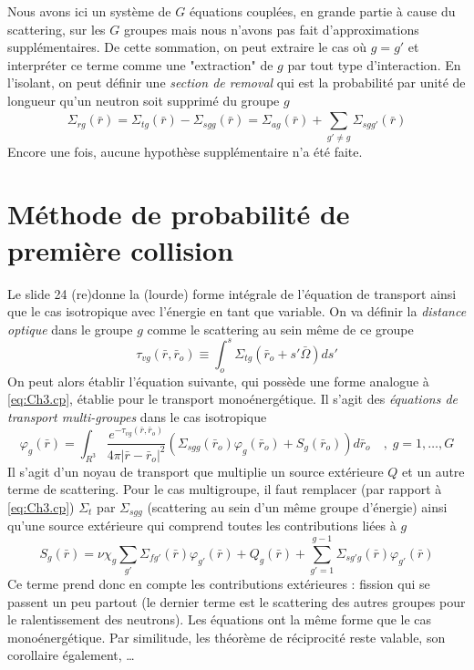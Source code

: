 Nous avons ici un système de $G$ équations couplées, en grande partie à cause du scattering, sur les
$G$ groupes mais nous n'avons pas fait d'approximations supplémentaires. De cette sommation, on 
peut extraire le cas où $g=g'$ et interpréter ce terme comme une "extraction" de $g$ par tout type 
d'interaction. En l'isolant, on peut définir une \textit{section de removal} qui est la probabilité par unité de longueur qu'un neutron soit supprimé du groupe $g$
\begin{equation}
{\Sigma _{rg}}(\bar r) = {\Sigma _{tg}}(\bar r) - {\Sigma _{sgg}}(\bar r) = {\Sigma _{ag}}(\bar r) + \sum\limits_{g' \ne g}^{}    {\Sigma _{sgg'}}(\bar r)
\end{equation}
Encore une fois, aucune hypothèse supplémentaire n'a été faite.







\newpage
\section{Méthode de probabilité de première collision}
Le slide 24 (re)donne la (lourde) forme intégrale de l'équation de transport ainsi que le cas 
isotropique avec l'énergie en tant que variable. On va définir la \textit{distance optique} dans le
groupe $g$ comme le scattering au sein même de ce groupe
\begin{equation}
{\tau _{vg}}(\bar r,{\bar r_o}) \equiv \int_o^s    {\Sigma _{tg}}({\bar r_o} + s'\bar \Omega )ds'
\end{equation}
On peut alors établir l'équation suivante, qui possède une forme analogue à \eqref{eq:Ch3.cp}, 
établie pour le transport monoénergétique. Il s'agit des \textit{équations de transport 
multi-groupes} dans le cas isotropique
\begin{equation}
{\varphi _g}(\bar r) = \int_{{R^3}}^{} {  \frac{{{e^{ - {\tau _{vg}}(\bar r,{{\bar r}_o})}}}}{{4\pi {{\left| {\bar r - {{\bar r}_o}} \right|}^2}}}} ({\Sigma _{sgg}}({\bar r_o}){\varphi _g}({\bar r_o}) + {S_g}({\bar r_o}))d{\bar r_o}\quad ,\;g = 1,\dots,G
\end{equation}
Il s'agit d'un noyau de transport que multiplie un source extérieure $Q$ et un autre terme de 
scattering. Pour le cas multigroupe, il faut remplacer (par rapport à \eqref{eq:Ch3.cp}) $\Sigma_t$
par $\Sigma_{sgg}$ (scattering au sein d'un même groupe d'énergie) ainsi qu'une source extérieure qui
comprend toutes les contributions liées à $g$
\begin{equation}
{S_g}(\bar r) = \nu {\chi _g}\sum\limits_{g'}^{}    {\Sigma _{fg'}}(\bar r){\varphi _{g'}}(\bar r) + {Q_g}(\bar r) + \sum\limits_{g' = 1}^{g - 1}   {\Sigma _{sg'g}}(\bar r){\varphi _{g'}}(\bar r)
\end{equation}
Ce terme prend donc en compte les contributions extérieures : fission qui se passent un peu partout 
(le dernier terme est le scattering des autres groupes pour le ralentissement des neutrons). Les 
équations ont la même forme que le cas monoénergétique. Par similitude, les théorème de réciprocité 
reste valable, son corollaire également, \dots


